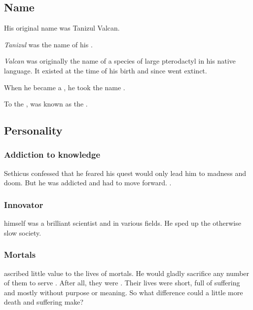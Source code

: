 \subsection{Name}
His original name was Tanizul Valcan. 

\emph{Tanizul} was the name of his .

\emph{Valcan} was originally the name of a species of large pterodactyl in his native \Saphyr language. It existed at the time of his birth and since went extinct. 

When he became a \dragon, he took the name \emph{\Sethicus}. 

To the \Ortaicans, \Sethicus was known as the \taortha {}.









\subsection{Personality}





\subsubsection{Addiction to knowledge}
Sethicus confessed that he feared his quest would only lead him to madness and doom. 
But he was addicted and had to move forward. 
. 





\subsubsection{Innovator}
\Sethicus himself was a brilliant scientist and  in various fields. 
He sped up the otherwise slow \ophidian society. 





\subsubsection{Mortals}
\Sethicus ascribed little value to the lives of mortals. 
He would gladly sacrifice any number of them to serve . 
After all, they were . 
Their lives were short, full of suffering and mostly without purpose or meaning.
So what difference could a little more death and suffering make?





